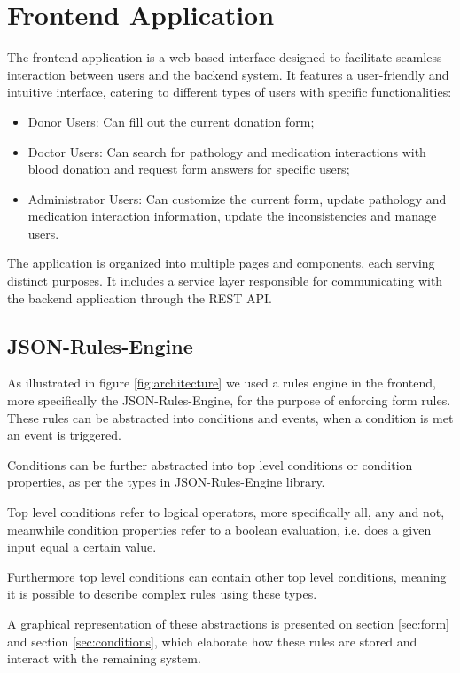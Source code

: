 \section{Frontend Application}\label{architecture_frontend}

The frontend application is a web-based interface designed to facilitate seamless interaction between users and the backend system. It features a user-friendly and intuitive interface, catering to different types of users with specific functionalities:

\begin{itemize}
	\item Donor Users: Can fill out the current donation form;
	\item Doctor Users: Can search for pathology and medication interactions with blood donation and request form answers for specific users;
	\item Administrator Users: Can customize the current form, update pathology and medication interaction information, update the inconsistencies and manage users.
\end{itemize}

The application is organized into multiple pages and components, each serving distinct purposes. It includes a service layer responsible for communicating with the backend application through the REST API.

\subsection{JSON-Rules-Engine}

As illustrated in figure \ref{fig:architecture} we used a rules engine in the frontend, more specifically the JSON-Rules-Engine, for the purpose of enforcing form rules.
These rules can be abstracted into conditions and events, when a condition is met an event is triggered.

Conditions can be further abstracted into top level conditions or condition properties, as per the types in JSON-Rules-Engine library.

Top level conditions refer to logical operators, more specifically all, any and not, meanwhile condition properties refer to a boolean evaluation, i.e. does a given input equal a certain value.

Furthermore top level conditions can contain other top level conditions, meaning it is possible to describe complex rules using these types.

A graphical representation of these abstractions is presented on section \ref{sec:form} and section \ref{sec:conditions}, which elaborate how these rules are stored and interact with the remaining system.

